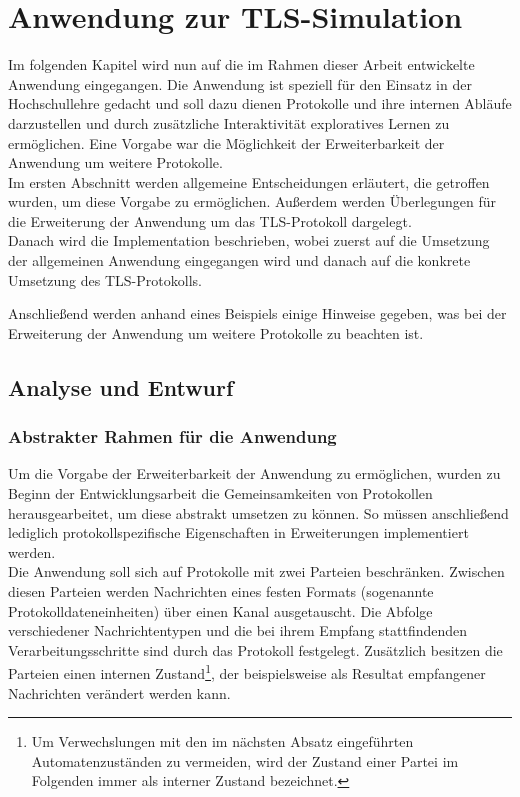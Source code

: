 \chapter{Anwendung zur TLS-Simulation}
\label{cha_implementation}

Im folgenden Kapitel wird nun auf die im Rahmen dieser Arbeit entwickelte Anwendung eingegangen. 
Die Anwendung ist speziell für den Einsatz in der Hochschullehre gedacht und soll dazu dienen Protokolle und ihre internen Abläufe darzustellen und durch zusätzliche Interaktivität exploratives Lernen zu ermöglichen. Eine Vorgabe war die Möglichkeit der Erweiterbarkeit der Anwendung um weitere Protokolle. \\
Im ersten Abschnitt werden allgemeine Entscheidungen erläutert, die getroffen wurden, um diese Vorgabe zu ermöglichen. Außerdem werden Überlegungen für die Erweiterung der Anwendung um das TLS-Protokoll dargelegt.\\
Danach wird die Implementation beschrieben, wobei zuerst auf die Umsetzung der allgemeinen Anwendung eingegangen wird und danach auf die konkrete Umsetzung des TLS-Protokolls.

Anschließend werden anhand eines Beispiels einige Hinweise gegeben, was bei der Erweiterung der Anwendung um weitere Protokolle zu beachten ist.

\section{Analyse und Entwurf}

\subsection{Abstrakter Rahmen für die Anwendung}

Um die Vorgabe der Erweiterbarkeit der Anwendung zu ermöglichen, wurden zu Beginn der Entwicklungsarbeit die Gemeinsamkeiten von Protokollen herausgearbeitet, um diese abstrakt umsetzen zu können. So müssen anschließend lediglich protokollspezifische Eigenschaften in Erweiterungen implementiert werden.\\
Die Anwendung soll sich auf Protokolle mit zwei Parteien beschränken. Zwischen diesen Parteien werden Nachrichten eines festen Formats (sogenannte Protokolldateneinheiten) über einen Kanal ausgetauscht. Die Abfolge verschiedener Nachrichtentypen und die bei ihrem Empfang stattfindenden Verarbeitungsschritte sind durch das Protokoll festgelegt. Zusätzlich besitzen die Parteien einen internen Zustand\footnote{
	Um Verwechslungen mit den im nächsten Absatz eingeführten Automatenzuständen zu vermeiden, wird der Zustand einer Partei im Folgenden immer als interner Zustand bezeichnet.
}, der beispielsweise als Resultat empfangener Nachrichten verändert werden kann. 

